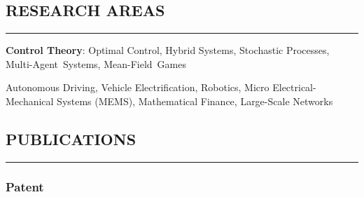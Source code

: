 \documentclass{article}
\begin{document}
\vspace{-8pt}

\subsection*{RESEARCH AREAS}
\vspace{-2pt}
\hrule
\vspace{6pt}


{\textbf{Control Theory}:} {Optimal Control, Hybrid Systems, Stochastic Processes, \mbox{Multi-Agent Systems}, \mbox{Mean-Field Games}}

\vspace{1pt}

 {Autonomous Driving, Vehicle Electrification, Robotics, Micro Electrical-Mechanical Systems (MEMS), Mathematical Finance, Large-Scale Networks}

\vspace{-8pt}

\subsection*{PUBLICATIONS}
\vspace{-2pt}
\hrule
\vspace{6pt}


\subsubsection*{Patent}
\vspace{-3pt}
\renewcommand{\labelenumi}{[P\arabic{enumi}]}
\begin{etaremune}[topsep=0pt,itemsep=0pt,partopsep=0pt,parsep=0pt]
\item {}

\end{etaremune}
\end{document}
